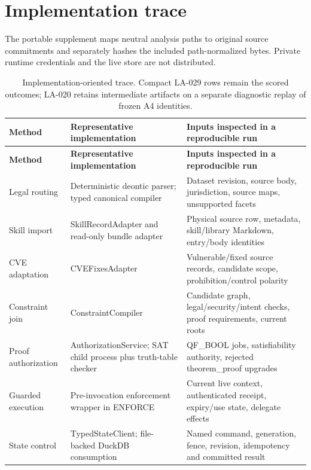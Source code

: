 \documentclass{article}
\begin{document}
\section{Implementation trace}

The portable supplement maps neutral analysis paths to original source commitments and separately hashes the included path-normalized bytes. Private runtime credentials and the live store are not distributed.
\begingroup
\renewcommand{\thetable}{D1}
\begin{longtable}{@{}>{\raggedright\arraybackslash}p{.24\linewidth} >{\raggedright\arraybackslash}p{.32\linewidth} >{\raggedright\arraybackslash}p{.38\linewidth}@{}}
\caption{Implementation-oriented trace. Compact LA-029 rows remain the scored outcomes; LA-020 retains intermediate artifacts on a separate diagnostic replay of frozen A4 identities.}\label{tab:D1}\\
\toprule
\textbf{Method} & \textbf{Representative implementation} & \textbf{Inputs inspected in a reproducible run} \\
\midrule
\endfirsthead
\textbf{Method} & \textbf{Representative implementation} & \textbf{Inputs inspected in a reproducible run} \\
\midrule
\endhead
\bottomrule
\endlastfoot
Legal routing & Deterministic deontic parser; typed canonical compiler & Dataset revision, source body, jurisdiction, source maps, unsupported facets \\[3pt]
Skill import & SkillRecordAdapter and read-only bundle adapter & Physical source row, metadata, skill/library Markdown, entry/body identities \\[3pt]
CVE adaptation & CVEFixesAdapter & Vulnerable/fixed source records, candidate scope, prohibition/control polarity \\[3pt]
Constraint join & ConstraintCompiler & Candidate graph, legal/security/intent checks, proof requirements, current roots \\[3pt]
Proof authorization & AuthorizationService; SAT child process plus truth-table checker & QF\_BOOL jobs, satisfiability authority, rejected theorem\_proof upgrades \\[3pt]
Guarded execution & Pre-invocation enforcement wrapper in ENFORCE & Current live context, authenticated receipt, expiry/use state, delegate effects \\[3pt]
State control & TypedStateClient; file-backed DuckDB consumption & Named command, generation, fence, revision, idempotency and committed result \\[3pt]
\end{longtable}
\endgroup
\end{document}

